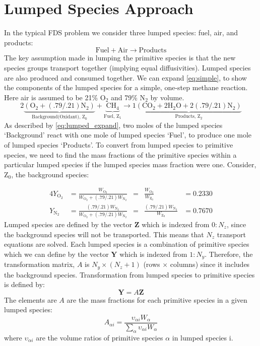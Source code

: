 \section{Lumped Species Approach}
In the typical FDS problem we consider three lumped species: fuel, air, and products:
\begin{equation}\label{eq:simple}
\mathrm{Fuel + Air \rightarrow Products}
\end{equation}
The key assumption made in lumping the primitive species is that the new species groups transport together (implying equal diffusivities). Lumped species are also produced and consumed together. We can expand \ref{eq:simple}, to show the components of the lumped species for a simple, one-step methane reaction. Here air is assumed to be 21\% O$_2$ and 79\% N$_2$ by volume.
\begin{equation}\label{eq:lumped_expand}
\mathrm{2\underbrace{(\mbox{O}_2+(.79/.21)\mbox{N}_2)}_\text{Background(Oxidant),~Z$_0$}+\underbrace{\mbox{CH}_4}_\text{Fuel,~Z$_1$} \rightarrow 1\underbrace{(\mbox{CO}_2+2\mbox{H}_2\mbox{O}+2(.79/.21)\mbox{N}_2)}_\text{Products,~Z$_2$}}
\end{equation}
As described by \ref{eq:lumped_expand}, two moles of the lumped species `Background' react with one mole of lumped species `Fuel', to produce one mole of lumped species `Products'. To convert from lumped species to primitive species, we need to find the mass fractions of the primitive species within a particular lumped species if the lumped species mass fraction were one. Consider, Z$_0$, the background species:

\begin{alignat}{4}\label{eq:backgroud}
Y_\mathrm{O_{2}} &= \frac{W_\mathrm{O_{2}}}{W_\mathrm{O_{2}}+(.79/.21)W_\mathrm{N_{2}}} &=& \frac{W_\mathrm{O_{2}}}{W_{\mathrm{Z_0}}} &= 0.2330 \\
\nonumber Y_\mathrm{N_{2}} &= \frac{(.79/.21)W_\mathrm{N_{2}}}{W_\mathrm{O_{2}}+(.79/.21)W_\mathrm{N_{2}}} &=& \frac{(.79/.21)W_\mathrm{N_{2}}}{W_{\mathrm{Z_0}}} &= 0.7670
\end{alignat}
Lumped species are defined by the vector $\textbf{Z}$ which is indexed from $0:N_{z}$, since the background species will not be transported. This means that $N_{z}$ transport equations are solved. Each lumped species is a combination of primitive species which we can define by the vector $\textbf{Y}$ which is indexed from $1:N_{y}$. Therefore, the transformation matrix, $A$ is $N_{y} \times (N_{z}+1)$ (rows $\times$ columns) since it includes the background species. Transformation from lumped species to primitive species is defined by: 
\begin{equation}\label{eq:transform}
\textbf{Y}=A\textbf{Z} 
\end{equation}
The elements are $A$ are the mass fractions for each primitive species in a given lumped species:
\begin{equation}\label{eq:A_def}
A_{\alpha i} = \frac{\upsilon_{\alpha i}W_{\alpha}}{\displaystyle \sum_{\alpha}\upsilon_{\alpha i}W_{\alpha}}
\end{equation}
where $\upsilon_{\alpha i}$ are the volume ratios of primitive species $\alpha$ in lumped species {i}.

